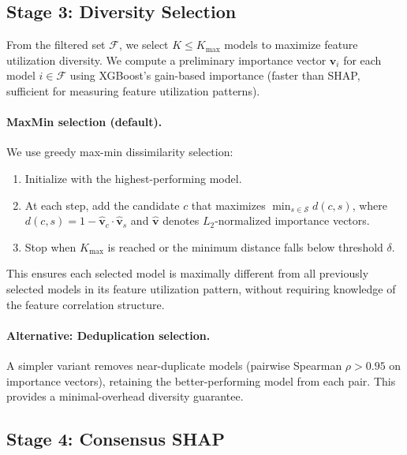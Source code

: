 \documentclass[11pt]{article}
\newcommand{\rhovar}{\rho}
\begin{document}
\subsection{Stage 3: Diversity Selection}

From the filtered set $\mathcal{F}$, we select $K \leq K_{\max}$
models to maximize feature utilization diversity. We compute a
preliminary importance vector $\mathbf{v}_i$ for each model $i \in
\mathcal{F}$ using XGBoost's gain-based importance (faster than SHAP,
sufficient for measuring feature utilization patterns).

\paragraph{MaxMin selection (default).}
We use greedy max-min dissimilarity selection:
\begin{enumerate}
  \item Initialize with the highest-performing model.
  \item At each step, add the candidate $c$ that maximizes
    $\min_{s \in \mathcal{S}} d(c, s)$, where
    $d(c, s) = 1 - \hat{\mathbf{v}}_c \cdot \hat{\mathbf{v}}_s$
    and $\hat{\mathbf{v}}$ denotes $L_2$-normalized importance vectors.
  \item Stop when $K_{\max}$ is reached or the minimum distance falls
    below threshold $\delta$.
\end{enumerate}

This ensures each selected model is maximally different from all previously
selected models in its feature utilization pattern, without requiring
knowledge of the feature correlation structure.

\paragraph{Alternative: Deduplication selection.}
A simpler variant removes near-duplicate models (pairwise Spearman
$\rhovar > 0.95$ on importance vectors), retaining the better-performing
model from each pair. This provides a minimal-overhead diversity guarantee.

\subsection{Stage 4: Consensus SHAP}
\end{document}
